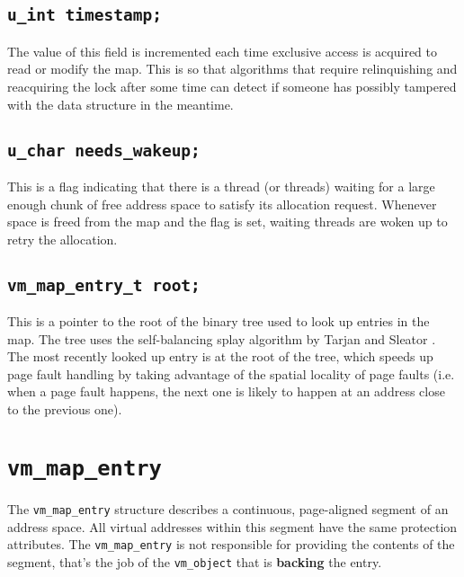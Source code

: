 \documentclass[shortabstract, english]{iithesis}
\begin{document}
\subsection*{\texttt{u_int timestamp;}}
The value of this field is incremented each time exclusive access is acquired to
read or modify the map. This is so that algorithms that require relinquishing
and reacquiring the lock after some time can detect if someone has possibly
tampered with the data structure in the meantime.

\subsection*{\texttt{u_char needs_wakeup;}}
This is a flag indicating that there is a thread (or threads) waiting for a
large enough chunk of free address space to satisfy its allocation request.
Whenever space is freed from the map and the flag is set, waiting threads are
woken up to retry the allocation.

\subsection*{\texttt{vm_map_entry_t root;}}
This is a pointer to the root of the binary tree used to look up entries in the
map. The tree uses the self-balancing splay algorithm by Tarjan and Sleator
\cite{bib:splay}. The most recently looked up entry is at the root of the tree,
which speeds up page fault handling by taking advantage of the spatial locality
of page faults (i.e. when a page fault happens, the next one is likely to happen
at an address close to the previous one).

\section{\texttt{vm_map_entry}}

The \texttt{vm_map_entry} structure describes a continuous, page-aligned
segment of an address space. All virtual addresses within this segment have
the same protection attributes. The \texttt{vm_map_entry} is not responsible
for providing the contents of the segment, that's the job of the
\texttt{vm_object} that is \textbf{backing} the entry.
\end{document}
